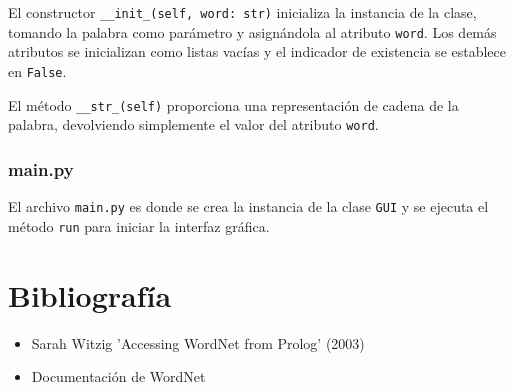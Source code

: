 \documentclass[12pt]{article}
\begin{document}
El constructor \texttt{\_\_init\_(self, word: str)} inicializa la instancia de la clase, tomando la palabra como parámetro y asignándola al atributo \texttt{word}. Los demás atributos se inicializan como listas vacías y el indicador de existencia se establece en \texttt{False}.

El método \texttt{\_\_str\_(self)} proporciona una representación de cadena de la palabra, devolviendo simplemente el valor del atributo \texttt{word}.

\subsubsection{main.py}

El archivo \texttt{main.py} es donde se crea la instancia de la clase \texttt{GUI} y se ejecuta el método \texttt{run} para iniciar la interfaz gráfica.

\section{Bibliografía}

\begin{itemize}
    \item Sarah Witzig 'Accessing WordNet from Prolog' (2003)
    \item Documentación de WordNet
\end{itemize}
\end{document}
